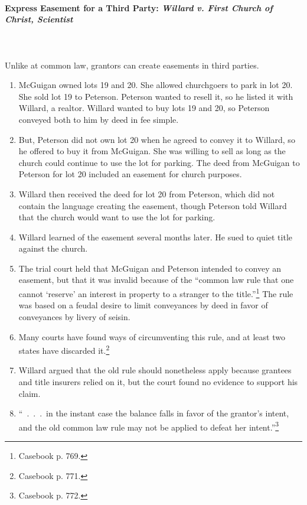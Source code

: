 \paragraph{Express Easement for a Third Party: \emph{Willard v. First Church 
of Christ, Scientist}}
~\\\\
Unlike at common law, grantors can create easements in third parties.

\begin{enumerate}
    \item McGuigan owned lots 19 and 20. She allowed churchgoers to park in 
    lot 20. She sold lot 19 to Peterson. Peterson wanted to resell it, so he 
    listed it with Willard, a realtor. Willard wanted to buy lots 19 and 20, 
    so Peterson conveyed both to him by deed in fee simple.
    \item But, Peterson did not own lot 20 when he agreed to convey it to 
    Willard, so he offered to buy it from McGuigan. She was willing to sell 
    as long as the church could continue to use the lot for parking. The deed 
    from McGuigan to Peterson for lot 20 included an easement for church 
    purposes.
    \item Willard then received the deed for lot 20 from Peterson, which did 
    not contain the language creating the easement, though Peterson told 
    Willard that the church would want to use the lot for parking.
    \item Willard learned of the easement several months later. He sued to 
    quiet title against the church.
    \item The trial court held that McGuigan and Peterson intended to convey 
    an easement, but that it was invalid because of the ``common law rule that 
    one cannot `reserve' an interest in property to a stranger to the 
    title.''\footnote{Casebook p. 769.} The rule was based on a feudal desire 
    to limit conveyances by deed in favor of conveyances by livery of seisin.
    \item Many courts have found ways of circumventing this rule, and at least 
    two states have discarded it.\footnote{Casebook p. 771.}
    \item Willard argued that the old rule should nonetheless apply because 
    grantees and title insurers relied on it, but the court found no evidence 
    to support his claim.
    \item ``~.~.~.~in the instant case the balance falls in favor of the 
    grantor's intent, and the old common law rule may not be applied to defeat 
    her intent.''\footnote{Casebook p. 772.}
\end{enumerate}


